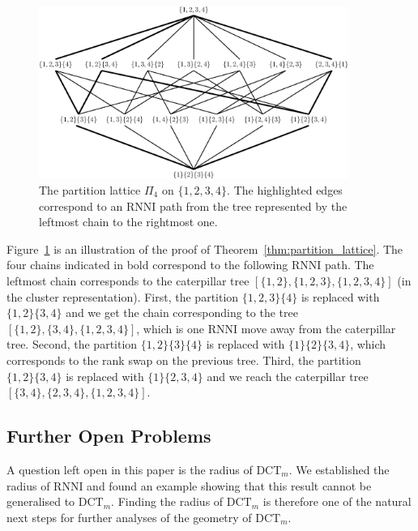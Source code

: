 \documentclass[11pt]{amsart}
\newcommand{\rnni}{\mathrm{RNNI}}
\newcommand{\dtt}{\mathrm{DCT}}
\newcommand{\summary}[1]{} %
\begin{document}
\begin{figure}[H]
\centering
\includegraphics[width=0.9\textwidth]{partition_lattice4}
\vspace{12pt}
\caption{The partition lattice $\Pi_4$ on $\{1,2,3,4\}$.
The highlighted edges correspond to an $\rnni$ path from the tree represented by the leftmost chain to the rightmost one.}
\label{fig:partition_lattice4}
\end{figure}

Figure~\ref{fig:partition_lattice4} is an illustration of the proof of Theorem~\ref{thm:partition_lattice}.
The four chains indicated in bold correspond to the following $\rnni$ path.
The leftmost chain corresponds to the caterpillar tree $[\{1, 2\}, \{1, 2, 3\}, \{1, 2, 3, 4\}]$ (in the cluster representation).
First, the partition $\{1, 2, 3\} \{4\}$ is replaced with $\{1, 2\} \{3, 4\}$ and we get the chain corresponding to the tree $[\{1, 2\}, \{3, 4\}, \{1, 2, 3, 4\}]$, which is one $\rnni$ move away from the caterpillar tree.
Second, the partition $\{1, 2\} \{3\} \{4\}$ is replaced with $\{1\} \{2\} \{3, 4\}$, which corresponds to the rank swap on the previous tree.
Third, the partition $\{1, 2\} \{3, 4\}$ is replaced with $\{1\} \{2, 3, 4\}$ and we reach the caterpillar tree $[\{3,4\}, \{2, 3, 4\}, \{1, 2, 3, 4\}]$.

\subsection{Further Open Problems}

\summary{Radius $\dtt_m$}
A question left open in this paper is the radius of $\dtt_m$.
We established the radius of $\rnni$ and found an example showing that this result cannot be generalised to $\dtt_m$.
Finding the radius of $\dtt_m$ is therefore one of the natural next steps for further analyses of the geometry of $\dtt_m$.
\end{document}
